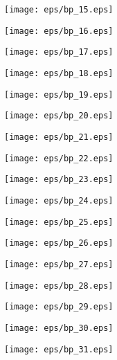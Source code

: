 \documentclass{book}
\begin{document}
	\clearpage\begin{figure}[p]
    \centering
	\texttt{[image: eps/bp\_15.eps]}
	\end{figure}
	\clearpage\begin{figure}[p]
    \centering
	\texttt{[image: eps/bp\_16.eps]}
	\end{figure}
	\clearpage\begin{figure}[p]
    \centering
	\texttt{[image: eps/bp\_17.eps]}
	\end{figure}
	\clearpage\begin{figure}[p]
    \centering
	\texttt{[image: eps/bp\_18.eps]}
	\end{figure}
	\clearpage\begin{figure}[p]
    \centering
	\texttt{[image: eps/bp\_19.eps]}
	\end{figure}
	\clearpage\begin{figure}[p]
    \centering
	\texttt{[image: eps/bp\_20.eps]}
	\end{figure}
	\clearpage\begin{figure}[p]
    \centering
	\texttt{[image: eps/bp\_21.eps]}
	\end{figure}
	\clearpage\begin{figure}[p]
    \centering
	\texttt{[image: eps/bp\_22.eps]}
	\end{figure}
	\clearpage\begin{figure}[p]
    \centering
	\texttt{[image: eps/bp\_23.eps]}
	\end{figure}
	\clearpage\begin{figure}[p]
    \centering
	\texttt{[image: eps/bp\_24.eps]}
	\end{figure}
	\clearpage\begin{figure}[p]
    \centering
	\texttt{[image: eps/bp\_25.eps]}
	\end{figure}
	\clearpage\begin{figure}[p]
    \centering
	\texttt{[image: eps/bp\_26.eps]}
	\end{figure}
	\clearpage\begin{figure}[p]
    \centering
	\texttt{[image: eps/bp\_27.eps]}
	\end{figure}
	\clearpage\begin{figure}[p]
    \centering
	\texttt{[image: eps/bp\_28.eps]}
	\end{figure}
	\clearpage\begin{figure}[p]
    \centering
	\texttt{[image: eps/bp\_29.eps]}
	\end{figure}
	\clearpage\begin{figure}[p]
    \centering
	\texttt{[image: eps/bp\_30.eps]}
	\end{figure}
	\clearpage\begin{figure}[p]
    \centering
	\texttt{[image: eps/bp\_31.eps]}
	\end{figure}
	\clearpage
\end{document}
